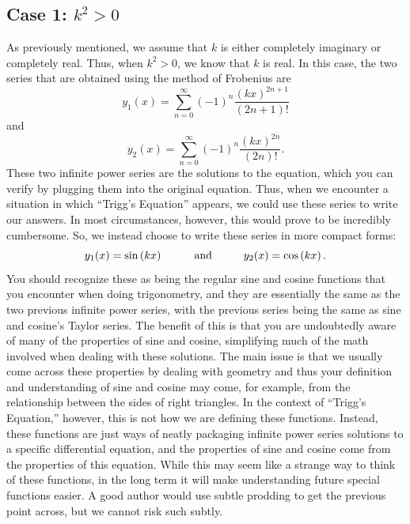 \documentclass[11pt]{report}
\newcommand{\fpar}[1]{\left({#1}\right)}
\begin{document}
\subsection*{Case 1: $k^2>0$}
As previously mentioned, we assume that $k$ is either completely imaginary or completely real. Thus, when $k^2>0$, we know that $k$ is real. In this case, the two series that are obtained using the method of Frobenius are
    \begin{equation*}
        y_1(x) = \sum_{n=0}^\infty(-1)^n\frac{\fpar{kx}^{2n+1}}{\fpar{2n+1}!}
    \end{equation*}
and
    \begin{equation*}
        y_2(x) = \sum_{n=0}^\infty(-1)^n\frac{\fpar{kx}^{2n}}{\fpar{2n}!}.
    \end{equation*}
These two infinite power series are the solutions to the equation, which you can verify by plugging them into the original equation. Thus, when we encounter a situation in which ``Trigg's Equation'' appears, we could use these series to write our answers. In most circumstances, however, this would prove to be incredibly cumbersome. So, we instead choose to write these series in more compact forms:
    \begin{equation}
        y_1(x) = \sin\fpar{kx} \text{\hspace{1cm}and\hspace{1cm}} y_2(x) = \cos\fpar{kx}.
    \end{equation}
You should recognize these as being the regular sine and cosine functions that you encounter when doing trigonometry, and they are essentially the same as the two previous infinite power series, with the previous series being the same as sine and cosine's Taylor series. The benefit of this is that you are undoubtedly aware of many of the properties of sine and cosine, simplifying much of the math involved when dealing with these solutions. The main issue is that we usually come across these properties by dealing with geometry and thus your definition and understanding of sine and cosine may come, for example, from the relationship between the sides of right triangles. In the context of ``Trigg's Equation,'' however, this is not how we are defining these functions. Instead, these functions are just ways of neatly packaging infinite power series solutions to a specific differential equation, and the properties of sine and cosine come from the properties of this equation. While this may seem like a strange way to think of these functions, in the long term it will make understanding future special functions easier. A good author would use subtle prodding to get the previous point across, but we cannot risk such subtly. \\
\end{document}
